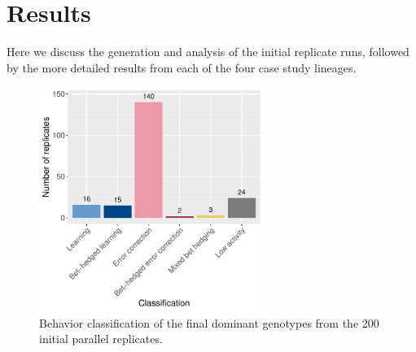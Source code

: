 \section{Results}

Here we discuss the generation and analysis of the initial replicate runs, followed by the more detailed results from each of the four case study lineages.

\begin{figure}[!h]
\begin{center}
\includegraphics[width=0.65\textwidth]{03_learning_case_studies/media/final_dom_classification.pdf}
\caption{Behavior classification of the final dominant genotypes from the 200 initial parallel replicates.}
\label{fig-final-dom-classification}
\end{center}
\end{figure}


\vspace*{-10mm}

